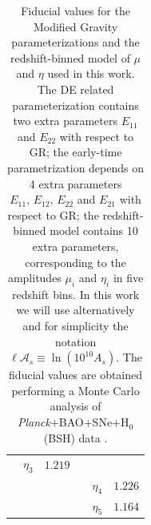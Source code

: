 \begin{table}[htbp]
\begin{tabular}{|cc|cc|cc|}
\multicolumn{1}{c|}{} & $\eta_{3}$  & $1.219$\tabularnewline
\multicolumn{1}{c}{} & \multicolumn{1}{c}{} & \multicolumn{1}{c}{} &
\multicolumn{1}{c|}{} & $\eta_{4}$  & $1.226$\tabularnewline
\multicolumn{1}{c}{} & \multicolumn{1}{c}{} & \multicolumn{1}{c}{} &
\multicolumn{1}{c|}{} & $\eta_{5}$  & $1.164$\tabularnewline
\cline{5-6} 
\end{tabular}\caption[Modified Gravity fiducials in three parametrizations]{\label{tab:fiducial-MG-AllCases} Fiducial values
for the Modified
Gravity parameterizations and the redshift-binned model of $\mu$
and $\eta$ used in this work. The DE related parameterization contains
two extra parameters $E_{11}$ and $E_{22}$ with respect to GR; the
early-time parametrization depends on 4 extra parameters
$E_{11},\,E_{12},\,E_{22}$
and $E_{21}$ with respect to GR; the redshift-binned model contains
10 extra parameters, corresponding to the amplitudes $\mu_{i}$ and
$\eta_{i}$ in five redshift bins. In this work we will
use alternatively and for simplicity the notation $\ell \mathcal{A}_s \equiv \ln(10^{10} A_{s})$.
The fiducial values are obtained
performing a Monte Carlo analysis of {\it Planck}+BAO+SNe+H$_{0}$ (BSH) data
\cite{planck_collaboration_planck_2016}.}
\label{tab:DEfid} 
\end{table}



